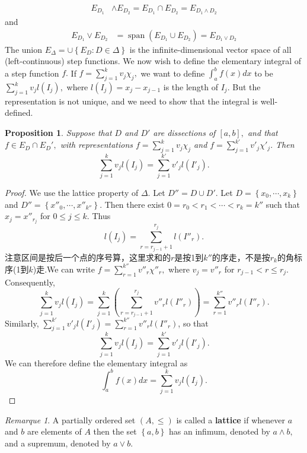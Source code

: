 \documentclass[12pt]{book}
\theoremstyle{definition}\newtheorem{dfn}{Définition}[chapter]
\theoremstyle{plain}\newtheorem{thm}{Théorème}[chapter]
\theoremstyle{plain}\newtheorem{prp}{Proposition}[chapter]
\theoremstyle{plain}\newtheorem{lem}{\bf Lemme}[chapter]
\theoremstyle{plain}\newtheorem{axm}{\bf Axiome}[chapter]
\theoremstyle{plain}\newtheorem{lmm}{\bf Lemme}[chapter]
\theoremstyle{plain}\newtheorem{cor}{\bf Corollaire}[chapter]
\theoremstyle{remark}\newtheorem{rem}{Remarque}[chapter]
\begin{document}
$$
\begin{aligned}
  E_{D_{1}} & \wedge E_{D_{2}}=E_{D_{1}} \cap E_{D_{2}}=E_{D_{1} \wedge D_{2}}
\end{aligned}
$$
and
$$
\begin{aligned}
 E_{D_{1}} \vee E_{D_{2}} &=\operatorname{span}\left(E_{D_{1}} \cup E_{D_{2}}\right)=E_{D_{1} \vee D_{2}}
\end{aligned}
$$
The union $E_{\Delta}=\cup\left\{E_{D}: D \in \Delta\right\}$ is the infinite-dimensional vector space of all (left-continuous) step functions.
We now wish to define the elementary integral of a step function $f .$ If $f=\sum_{j=1}^{k} v_{j} \chi_{j},$ we want to define $\int_{a}^{b} f(x) d x$ to be $\sum_{j=1}^{k} v_{j} l\left(I_{j}\right),$ where $l\left(I_{j}\right)=x_{j}-x_{j-1}$ is the length of $I_{j} .$ But the representation is not unique, and we need to show that the integral is well-defined.
\begin{prp}
  Suppose that $D$ and $D'$ are dissections of $[a, b],$ and that $f \in E_D\cap E_D' ,$ with representations $f =\sum^k_{j=1} v_j\chi_j$ and $f =\sum^{k'}_{j=1} v'_j\chi'_j .$ Then $$\sum^k_{j=1}v_jl(I_j)=\sum^{k'}_{j=1} v'_j l(I'_j).$$
\end{prp}
\begin{proof} We use the lattice property of $\Delta.$ Let $D'' = D \cup D'.$ Let $D = \left\{x_0,\cdots,x_k\right\}$ and $D'' = \left\{x''_0,\cdots,x''_{k''}\right\}.$ Then there exist $0 = r_0 < r_1 < \cdots < r_k = k''$ such that $x_j = x''_{r_j}$ for $0 \le j \le k.$ Thus $$l(I_j) =\sum^{r_j}_{r=r_{j−1}+1} l(I''_r).$$ 注意区间是按后一个点的序号算，这里求和的$r$是按1到$k''$的序走，不是按$r_{k}$的角标序(1到$k$)走.We can write $f =\sum^{k''}_{r=1} v''_r\chi''_r,$ where $v_j = v''_r$ for $r_{j−1} < r \le r_j.$ Consequently, $$\sum^k_{j=1}v_j l(I_j) = \sum^k_{j=1} \left( \sum^{r_j}_{r=r_{j−1}+1} v''_r l(I''_r )\right) = \sum^{k''}_{r=1} v''_r l(I''_r).$$
Similarly, $\sum^{k'}_{j=1}v'_j l(I'_j)=\sum^{k''}_{r=1} v''_r l(I''_r)$, so that $$\sum^k_{j=1}v_jl(I_j)=\sum^{k'}_{j=1} v'_j l(I'_j).$$
We can therefore define the elementary integral as $$\int_{a}^{b} f(x) d x=  \sum^k_{j=1}v_jl(I_j).$$
\end{proof}
\begin{rem}
A partially ordered set $(A, \le)$ is called a {\bf{lattice}} if
whenever $a$ and $b$ are elements of $A$ then the set $\left\{a,
  b\right\}$ has an infimum, denoted by $a\wedge b,$ and a supremum,
denoted by $a \vee b.$
\end{rem}
\end{document}
